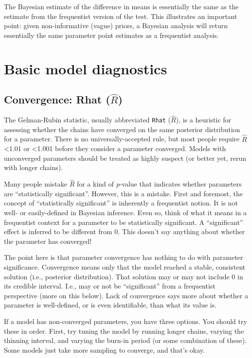\documentclass[
  13,
  letterpaper,
]{report}
\begin{document}
The Bayesian estimate of the difference in means is essentially the same
as the estimate from the frequentist version of the test. This
illustrates an important point: given non-informative (vague) priors, a
Bayesian analysis will return essentially the same parameter point
estimates as a frequentist analysis.

\section{Basic model diagnostics}\label{basic-model-diagnostics}

\subsection{\texorpdfstring{Convergence: Rhat
(\(\hat{R}\))}{Convergence: Rhat (\textbackslash hat\{R\})}}\label{convergence-rhat-hatr}

The Gelman-Rubin statistic, usually abbreviated \texttt{Rhat}
(\(\hat{R}\)), is a heuristic for assessing whether the chains have
converged on the same posterior distribution for a parameter. There is
no universally-accepted rule, but most people require \(\hat{R}\)
\textless1.01 or \textless1.001 before they consider a parameter
converged. Models with unconverged parameters should be treated as
highly suspect (or better yet, rerun with longer chains).

Many people mistake \(\hat{R}\) for a kind of \emph{p}-value that
indicates whether parameters are ``statistically significant''. However,
this is a mistake. First and foremost, the concept of ``statistically
significant'' is inherently a frequentist notion. It is not well- or
easily-defined in Bayesian inference. Even so, think of what it means in
a frequentist context for a parameter to be statistically significant. A
``significant'' effect is inferred to be different from 0. This doesn't
say anything about whether the parameter has converged!

The point here is that parameter convergence has nothing to do with
parameter significance. Convergence means only that the model reached a
stable, consistent solution (i.e., posterior distribution). That
solution may or may not include 0 in its credible interval. I.e., may or
not be ``significant'' from a frequentist perspective (more on this
below). Lack of convergence says more about whether a parameter is
well-defined, or is even identifiable, than what its value is.

If a model has non-converged parameters, you have three options. You
should try these in order. First, try tuning the model by running longer
chains, varying the thinning interval, and varying the burn-in period
(or some combination of these). Some models just take more sampling to
converge, and that's okay.
\end{document}

